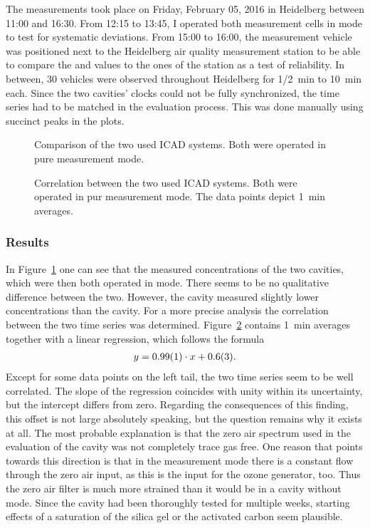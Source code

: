 The measurements took place on Friday, February 05, 2016 in Heidelberg
between 11:00 and 16:30. From 12:15 to 13:45, I operated both
measurement cells in  mode to test for systematic
deviations. From 15:00 to 16:00, the measurement vehicle was
positioned next to the Heidelberg air quality measurement station to
be able to compare the  and  values to the ones of the
station as a test of reliability. In between, 30 vehicles were
observed throughout Heidelberg for {\nfrac{} 1/2}~\si{\minute} to
\SI{10}{\minute} each.  Since the two cavities' clocks could not be
fully synchronized, the time series had to be matched in the
evaluation process. This was done manually using succinct peaks in the
plots.

\begin{figure}[htbp]
  \centering
  
  \caption{Comparison of the two used ICAD systems. Both were
    operated in pure  measurement mode.}
  \label{fig:hd-comparison}
\end{figure}
\begin{figure}[htbp]
  \centering
  
  \caption{Correlation between the two used ICAD systems. Both were
    operated in pur  measurement mode. The data points depict
    \SI{1}{\minute} averages.}
  \label{fig:hd-corr}
\end{figure}

\subsubsection{Results}
\label{sec:vehicle-results}

In Figure~\ref{fig:hd-comparison} one can see that the measured
 concentrations of the two cavities, which were then both
operated in  mode. There seems to be no qualitative difference
between the two. However, the  cavity measured slightly lower
concentrations than the  cavity. For a more precise analysis
the correlation between the two time series was
determined. Figure~\ref{fig:hd-corr} contains \SI{1}{\minute} averages
together with a linear regression, which follows the formula
\begin{align*}
  y = \num{0.99 \pm 0.01} \cdot x + \num{0.6 \pm 0.3}.
\end{align*}
Except for some data points on the left tail, the two time series seem
to be well correlated. The slope of the regression coincides with
unity within its uncertainty, but the intercept differs from
zero. Regarding the consequences of this finding, this offset is not
large absolutely speaking, but the question remains why it exists at
all. The most probable explanation is that the zero air spectrum used
in the evaluation of the  cavity was not completely trace gas
free. One reason that points towards this direction is that in the
 measurement mode there is a constant flow through the zero
air input, as this is the input for the ozone generator, too. Thus the
zero air filter is much more strained than it would be in a cavity
without  mode. Since the cavity had been thoroughly tested
for multiple weeks, starting effects of a saturation of the silica gel
or the activated carbon seem plausible.

